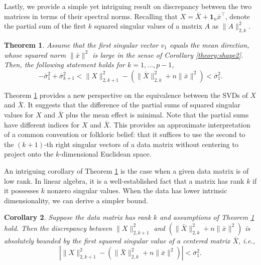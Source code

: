 \documentclass[11pt]{article}
\newtheorem{theorem}{Theorem}
\newtheorem{corollary}[theorem]{Corollary}
\newcommand{\bfone}{\mathbf{1}}
\begin{document}
Lastly, we provide a simple yet intriguing result on discrepancy between the two matrices in terms of their spectral norms. Recalling that   $X = \bar{X} + \bfone_n \bar{x}^\top$, denote the partial sum of the first $k$ squared singular values of a matrix $A$ as $\|A\|_{2,k}^2$. 




\vspace{0.25cm}
\begin{tcolorbox}[colback=GreenYellow]
\begin{theorem}\label{theory:partialSum}
	Assume that the first singular vector $v_1$ equals the mean direction, whose squared norm $\|\bar{x}\|^2$ is \textit{large} in the sense of Corollary \ref{theory:shape2}. Then, the following statement holds for $k=1,\ldots,p-1$,
	\begin{equation*}
		-\bar{\sigma}_1^2 + \bar{\sigma}_{k+1}^2 < \|X\|_{2,k+1}^2 - 
		(\|\bar{X}\|_{2,k}^2 + n \|\bar{x}\|^2) < \bar{\sigma}_1^2.
	\end{equation*}
\end{theorem}
\end{tcolorbox}
\vspace{0.25cm}




Theorem \ref{theory:partialSum} provides a new perspective on the equivalence between the SVDs of $X$ and $\bar{X}$. It suggests that the difference of the partial sums of squared singular values for $X$ and $\bar{X}$ plus the mean effect is minimal. Note that the partial sums have different indices for $X$ and $\bar{X}$. This provides an approximate interpretation of a common convention or folkloric belief: that it suffices to use the second to the $(k+1)$-th right singular vectors of a data matrix without centering to project onto the $k$-dimensional Euclidean space.



An intriguing corollary of Theorem \ref{theory:partialSum} is the case when a given data matrix is of low rank. In linear algebra, it is a well-established fact that a matrix has rank $k$ if it possesses $k$ nonzero singular values. When the data has lower intrinsic dimensionality, we can derive a simpler bound.



\vspace{0.25cm}
\begin{tcolorbox}[colback=GreenYellow]
\begin{corollary}\label{theory:partialSumCorollary}
	Suppose the data matrix has rank $k$ and assumptions of Theorem \ref{theory:partialSum} hold. Then the discrepancy between 
	$\|X\|_{2,k+1}^2$ and $(\|\bar{X}\|_{2,k}^2 + n \|\bar{x}\|^2)$ is absolutely bounded by the first squared singular value of a centered matrix $\bar{X}$, i.e., 
	\begin{equation*}
		| \|X\|_{2,k+1}^2 - 
		(\|\bar{X}\|_{2,k}^2 + n \|\bar{x}\|^2)| < \bar{\sigma}_1^2.
	\end{equation*}
\end{corollary}
\end{tcolorbox}
\vspace{0.25cm}
\end{document}
